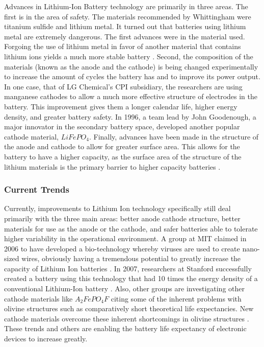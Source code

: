 \documentclass[12pt,oneside,letterpaper]{article}
\begin{document}
Advances in Lithium-Ion Battery technology are primarily in three areas.  The
first is in the area of safety.  The materials recommended by Whittingham were
titanium sulfide and lithium metal.  It turned out that batteries using lithium
metal are extremely dangerous.  The first advances were in the material used.
Forgoing the use of lithium metal in favor of another material that contains
lithium ions yields a much more stable battery \citep{samar1981}.  Second, the
composition of the materials (known as the anode and the cathode) is being
changed experimentally to increase the amount of cycles the battery has and to
improve its power output.  In one case, that of LG Chemical's CPI subsidiary,
the researchers are using manganese cathodes to allow a much more effective
structure of electrodes in the battery.  This improvement gives them a longer
calendar life, higher energy density, and greater battery safety.  In 1996, a
team lead by John Goodenough, a major innovator in the secondary battery space,
developed another popular cathode material, $LiFePO_4$.  Finally, advances have
been made in the structure of the anode and cathode to allow for greater surface
area.  This allows for the battery to have a higher capacity, as the surface
area of the structure of the lithium materials is the primary barrier to higher
capacity batteries \citep{idota1997}.

\subsubsection{Current Trends}

Currently, improvements to Lithium Ion technology specifically still deal
primarily with the three main areas: better anode cathode structure, better
materials for use as the anode or the cathode, and safer batteries able to
tolerate higher variability in the operational environment.  A group at MIT
claimed in 2006 to have developed a bio-technology whereby viruses are used to
create nano-sized wires, obviously having a tremendous potential to greatly
increase the capacity of Lithium Ion batteries \citep{nam2006}.  In 2007,
researchers at Stanford successfully created a battery using this technology
that had 10 times the energy density of a conventional Lithium-Ion battery
\citep{stanford2007}.  Also, other groups are investigating other cathode
materials like $A_2FePO_4F$ citing some of the inherent problems with olivine
structures such as comparatively short theoretical life expectancies.  New
cathode materials overcome these inherent shortcomings in olivine structures
\citep{ellis2007}.  These trends and others are enabling the battery life
expectancy of electronic devices to increase greatly.
\end{document}
